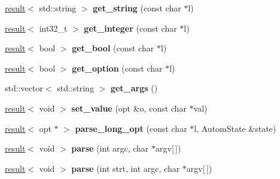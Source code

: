 \begin{DoxyCompactItemize}
\item 
\hyperlink{classgxx_1_1result__type_1_1result}{result}$<$ std\+::string $>$ {\bfseries get\+\_\+string} (const char $\ast$l)\hypertarget{classgxx_1_1cliopts_a2fcd50f503346b00dbf8b6880d3d3802}{}\label{classgxx_1_1cliopts_a2fcd50f503346b00dbf8b6880d3d3802}

\item 
\hyperlink{classgxx_1_1result__type_1_1result}{result}$<$ int32\+\_\+t $>$ {\bfseries get\+\_\+integer} (const char $\ast$l)\hypertarget{classgxx_1_1cliopts_a69cde10987004349a0c8449bc7edbde8}{}\label{classgxx_1_1cliopts_a69cde10987004349a0c8449bc7edbde8}

\item 
\hyperlink{classgxx_1_1result__type_1_1result}{result}$<$ bool $>$ {\bfseries get\+\_\+bool} (const char $\ast$l)\hypertarget{classgxx_1_1cliopts_a3e1794230a882a3d0ee1eb6750a9fad3}{}\label{classgxx_1_1cliopts_a3e1794230a882a3d0ee1eb6750a9fad3}

\item 
\hyperlink{classgxx_1_1result__type_1_1result}{result}$<$ bool $>$ {\bfseries get\+\_\+option} (const char $\ast$l)\hypertarget{classgxx_1_1cliopts_a46bc3c9afbe01fd8a11d060029c9f559}{}\label{classgxx_1_1cliopts_a46bc3c9afbe01fd8a11d060029c9f559}

\item 
std\+::vector$<$ std\+::string $>$ {\bfseries get\+\_\+args} ()\hypertarget{classgxx_1_1cliopts_a3f570a052437927c46ba1d76feb3cd01}{}\label{classgxx_1_1cliopts_a3f570a052437927c46ba1d76feb3cd01}

\item 
\hyperlink{classgxx_1_1result__type_1_1result}{result}$<$ void $>$ {\bfseries set\+\_\+value} (opt \&o, const char $\ast$val)\hypertarget{classgxx_1_1cliopts_a93a2473be8956bfbc96764302d75adf7}{}\label{classgxx_1_1cliopts_a93a2473be8956bfbc96764302d75adf7}

\item 
\hyperlink{classgxx_1_1result__type_1_1result}{result}$<$ opt $\ast$ $>$ {\bfseries parse\+\_\+long\+\_\+opt} (const char $\ast$l, Autom\+State \&state)\hypertarget{classgxx_1_1cliopts_a286f09ade7a04153ad3adaff65c50539}{}\label{classgxx_1_1cliopts_a286f09ade7a04153ad3adaff65c50539}

\item 
\hyperlink{classgxx_1_1result__type_1_1result}{result}$<$ void $>$ {\bfseries parse} (int argc, char $\ast$argv\mbox{[}$\,$\mbox{]})\hypertarget{classgxx_1_1cliopts_afe6a82c4b570f763d7688e02c026e411}{}\label{classgxx_1_1cliopts_afe6a82c4b570f763d7688e02c026e411}

\item 
\hyperlink{classgxx_1_1result__type_1_1result}{result}$<$ void $>$ {\bfseries parse} (int strt, int argc, char $\ast$argv\mbox{[}$\,$\mbox{]})\hypertarget{classgxx_1_1cliopts_a0fe68d3c8308b2be67dd3b9e1575b37e}{}\label{classgxx_1_1cliopts_a0fe68d3c8308b2be67dd3b9e1575b37e}

\end{DoxyCompactItemize}
